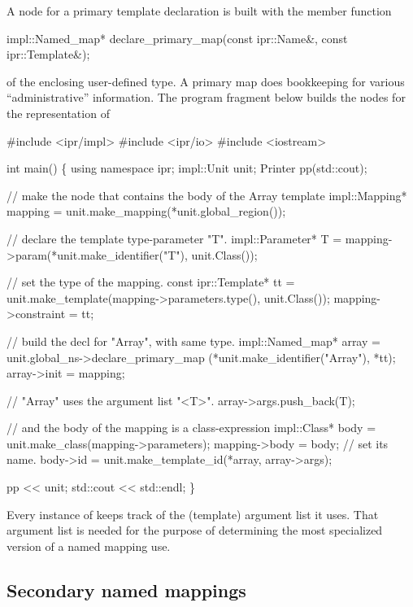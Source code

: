 \documentclass[11pt]{article}
\begin{document}
A node for a primary template declaration is built with the member function  
\begin{Program}
  impl::Named_map* declare_primary_map(const ipr::Name&, const ipr::Template&);
\end{Program}
of the enclosing user-defined type.  A primary map does bookkeeping for
various ``administrative'' information.  The program fragment below builds the
nodes for the representation of 
\begin{Program}
#include <ipr/impl>
#include <ipr/io>
#include <iostream>

int main()
\{
   using namespace ipr;
   impl::Unit unit;
   Printer pp(std::cout);

   // make the node that contains the body of the Array template
   impl::Mapping* mapping = unit.make_mapping(*unit.global_region());

   // declare the template type-parameter "T".
   impl::Parameter* T = mapping->param(*unit.make_identifier("T"),
                                       unit.Class());

   // set the type of the mapping.
   const ipr::Template* tt = unit.make_template(mapping->parameters.type(),
                                                unit.Class());
   mapping->constraint = tt;

   // build the decl for "Array", with same type.
   impl::Named_map* array = unit.global_ns->declare_primary_map
      (*unit.make_identifier("Array"), *tt);
   array->init = mapping;

   // "Array" uses the argument list "<T>".
   array->args.push_back(T);

   // and the body of the mapping is a class-expression
   impl::Class* body = unit.make_class(mapping->parameters);
   mapping->body = body;
   // set its name.
   body->id = unit.make_template_id(*array, array->args);

   pp << unit;
   std::cout << std::endl;
\}
\end{Program}

Every instance of  keeps track of the (template) argument
list it uses.  That argument list is needed for the purpose of determining
the most specialized version of a named mapping use.

\subsection{Secondary named mappings}
\label{sec:named-mapping:secondary}
\end{document}
